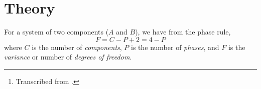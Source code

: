 \maketitle

\begin{abstract}
\noindent This experiment is concerned with the heterogeneous equilibrium between two phases in a system of two components, 
The particular system to be studied is acetone--chloroform at \qty{1}{\atm} pressure. 
This system exhibits a strong negative deviation from Raoult's law, resulting in the existence of a maximum boiling point.\thanks{Transcribed from \textcite{nibler14}.}
\end{abstract}

\section{Theory}
\label{sec:theory}

For a system of two components (\(A\) and \(B\)), we have from the phase rule,\cite{atkins94}
\begin{equation}
	F = C - P + 2 = 4 - P
	\label{eq:phase_components}
\end{equation}
where \(C\) is the number of \emph{components}, \(P\) is the number of \emph{phases}, and \(F\) is the \emph{variance} or number of \emph{degrees of freedom}.


